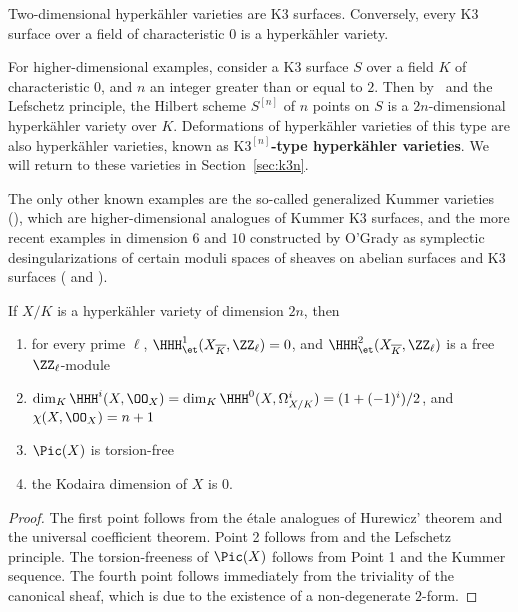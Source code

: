 \begin{example}\label{exa:hk_1}
Two-dimensional hyperk\"ahler varieties are K3 surfaces. Conversely, every K3 surface over a field of characteristic $0$ is a hyperk\"ahler variety.
\end{example}

\begin{example}\label{exa:hk_2}
For higher-dimensional examples, consider a K3 surface $S$ over a field $K$ of characteristic $0$, and $n$ an integer greater than or equal to $2$. Then by~\cite[Th\'eor\`eme~3]{Beauville} and the Lefschetz principle, the Hilbert scheme $S^{[n]}$ of $n$ points on $S$ is a $2n$-dimensional hyperk\"ahler variety over $K$. Deformations of hyperk\"ahler varieties of this type are also hyperk\"ahler varieties, known as {\bfseries $\text{K3}^{[n]}$-type hyperk\"ahler varieties}. We will return to these varieties in Section~\ref{sec:k3n}.
\end{example}

\begin{example}\label{exa:hk_3}
    The only other known examples are the so-called generalized Kummer varieties (\cite[{\S~7}]{Beauville}), which are higher-dimensional analogues of Kummer K3 surfaces, and the more recent examples in dimension $6$ and $10$ constructed by O'Grady as symplectic desingularizations of certain moduli spaces of sheaves on abelian surfaces and K3 surfaces (\cite{OGradyAbelian} and \cite{OGradyK3}).
\end{example}

\begin{proposition}\label{prop:basicpropshkvar}
If ${X}/{K}$ is a hyperk\"ahler variety of dimension $2n$, then
\begin{enumerate}
\item for every prime $\ell$, $\HHH^1_{\et}(X_{\overline{K}},\ZZ_{\ell}) = 0$, and $\HHH^2_{\et}(X_{\overline{K}},\ZZ_{\ell})$ is a free $\ZZ_{\ell}$-module\semicolon
\item $\dim_K \HHH^i(X,\OO_X) = \dim_K \HHH^0(X,\Omega^i_{{X}/{K}}) = {(1 + (-1)^{i})}/{2}$, and $\chi(X,\OO_X) = n + 1$\semicolon
\item $\Pic(X)$ is torsion-free\semicolon
\item the Kodaira dimension of $X$ is $0$.
\end{enumerate}
\end{proposition}
\begin{proof}
    The first point follows from the \'etale analogues of Hurewicz' theorem and the universal coefficient theorem. Point 2 follows from \cite[Proposition 3]{Beauville} and the Lefschetz principle. The torsion-freeness of $\Pic(X)$ follows from Point 1 and the Kummer sequence. The fourth point follows immediately from the triviality of the canonical sheaf, which is due to the existence of a non-degenerate $2$-form. %
\end{proof}

